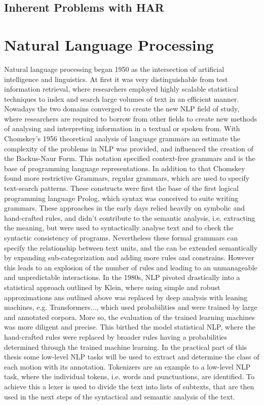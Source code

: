 \subsection{Inherent Problems with HAR}\label{subsec:probHAR}
\section{Natural Language Processing}
Natural language processing began 1950 as the intersection of artificial intelligence and linguistics. At first it was very distinguishable from test information retrieval, where researchers employed highly scalable statistical techniques to index and search large volumes of text in an efficient manner\cite{nadkarni2011natural}. Nowadays the two domains converged to create the new NLP field of study, where researchers are required to borrow from other fields to create new methods of analysing and interpreting information in a textual or spoken from.\newline
With Chomskey's 1956 theoretical analysis of language grammars an estimate the complexity of the problems in NLP was provided, and influenced the creation of the Backus-Naur Form. This notation specified context-free grammars and is the base of programming language representations. In addition to that Chomskey found more restrictive Grammars, regular grammars, which are used to specify text-search patterns\cite{nadkarni2011natural}. These constructs were first the base of the first logical programming language Prolog, which syntax was conceived to suite writing grammars.\newline
These approaches in the early days relied heavily on symbolic and hand-crafted rules, and didn't contribute to the semantic analysis, i.e. extracting the meaning, but were used to syntactically analyse text and to check the syntactic consistency of programs. Nevertheless these formal grammars can specify the relationship between text units, and the can be extended semantically by expanding sub-categorization and adding more rules and constrains. However this leads to an explosion of the number of rules and leading to an unmanageable and unpredictable interactions\cite{nadkarni2011natural}.\newline
In the 1980s, NLP pivoted drastically into a statistical approach outlined by Klein\cite{kleincs}, where using simple and robust approximations ans outlined above was replaced by deep analysis with leaning machines, e.g. Transformers..., which used probabilities and were trained by large and annotated corpora. More so, the evaluation of the trained learning machines was more diligent and precise\cite{nadkarni2011natural}. This birthed the model statistical NLP, where the hand-crafted rules were replaced by broader rules having a probabilities determined through the trained machine learning\cite{kleincs}. In the practical part of this thesis some low-level NLP tasks will be used to extract and determine the class of each motion with its annotation. Tokenizers are an example to a low-level NLP task, where the individual tokens, i.e. words and punctuations, are identified. To achieve this a lexer is used to divide the text into lists of subtexts, that are then used in the next steps of the syntactical and semantic analysis of the text.\newline
